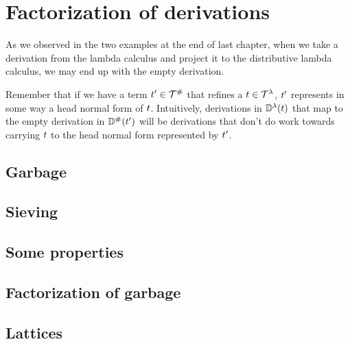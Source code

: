 \chapter{Factorization of derivations}

As we observed in the two examples at the end of last chapter,
when we take a derivation from the lambda calculus and project it
to the distributive lambda calculus, we may end up with the empty derivation.

Remember that if we have a term $t' \in \mathcal{T}^{\mathtt{\#}}$ that refines a $t \in \mathcal{T}^{\lambda}$,
$t'$ represents in some way a head normal form of $t$.
Intuitively, derivations in $\mathbb{D}^{\lambda}(t)$ that map to the empty derivation in
$\mathbb{D}^{\mathtt{\#}}(t')$ will be derivations that don't do work towards carrying
$t$ to the head normal form represented by $t'$.

\section{Garbage}


\section{Sieving}


\section{Some properties}


\section{Factorization of garbage}


\section{Lattices}

